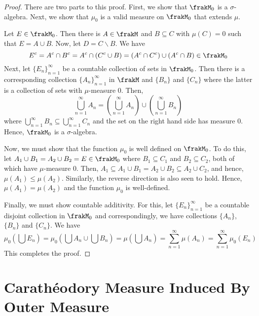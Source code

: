 \begin{proof}
    There are two parts to this proof. First, we show that $\frakM_0$ is a $\sigma$-algebra. Next, we show that $\mu_0$ is a valid measure on $\frakM_0$ that extends $\mu$. 

    Let $E\in\frakM_0$. Then there is $A\in\frakM$ and $B\subseteq C$ with $\mu(C) = 0$ such that $E = A\cup B$. Now, let $D = C\backslash B$. We have 
    \begin{equation*}
        E^c = A^c\cap B^c = A^c\cap(C^c\cup B) = (A^c\cap C^c)\cup(A^c\cap B)\in\frakM_0
    \end{equation*}
    Next, let $\{E_n\}_{n = 1}^\infty$ be a countable collection of sets in $\frakM_0$. Then there is a corresponding collection $\{A_n\}_{n = 1}^\infty$ in $\frakM$ and $\{B_n\}$ and $\{C_n\}$ where the latter is a collection of sets with $\mu$-measure $0$. Then,
    \begin{equation*}
        \bigcup_{n = 1}^\infty A_n = \left(\bigcup_{n = 1}^\infty A_n\right)\cup\left(\bigcup_{n = 1}^\infty B_n\right)
    \end{equation*}
    where $\bigcup\limits_{n = 1}^\infty B_n\subseteq\bigcup\limits_{n = 1}^\infty C_n$ and the set on the right hand side has measure $0$. Hence, $\frakM_0$ is a $\sigma$-algebra.

    Now, we must show that the function $\mu_0$ is well defined on $\frakM_0$. To do this, let $A_1\cup B_1 = A_2\cup B_2 = E\in\frakM_0$ where $B_1\subseteq C_1$ and $B_2\subseteq C_2$, both of which have $\mu$-measure $0$. Then, $A_1\subseteq A_1\cup B_1 = A_2\cup B_2\subseteq A_2\cup C_2$, and hence, $\mu(A_1)\le\mu(A_2)$. Similarly, the reverse direction is also seen to hold. Hence, $\mu(A_1) = \mu(A_2)$ and the function $\mu_0$ is well-defined.

    Finally, we must show countable additivity. For this, let $\{E_n\}_{n = 1}^\infty$ be a countable disjoint collection in $\frakM_0$ and correspondingly, we have collections $\{A_n\}$, $\{B_n\}$ and $\{C_n\}$. We have 
    \begin{equation*}
        \mu_0\left(\bigcup E_n\right) = \mu_0\left(\bigcup A_n\cup\bigcup B_n\right) = \mu\left(\bigcup A_n\right) = \sum_{n = 1}^\infty\mu(A_n) = \sum_{n = 1}^\infty\mu_0(E_n)
    \end{equation*}
    This completes the proof.
\end{proof}

\section{Carath\'eodory Measure Induced By Outer Measure}

